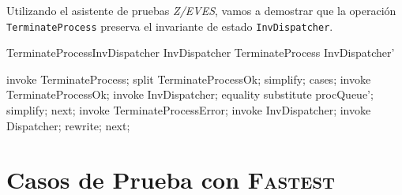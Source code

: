 \documentclass{article}
\begin{document}
Utilizando el asistente de pruebas \textit{Z/EVES}, vamos a demostrar que la operación \verb|TerminateProcess| preserva el invariante de estado \verb|InvDispatcher|.

\begin{theorem}{TerminateProcessInvDispatcher}
    InvDispatcher \land TerminateProcess \implies InvDispatcher'
\end{theorem}

\begin{zproof}[TerminateProcessInvDispatcher]
    invoke TerminateProcess;
    split TerminateProcessOk;
    simplify;
    cases;
    invoke TerminateProcessOk;
    invoke InvDispatcher;
    equality substitute procQueue';
    simplify;
    next;
    invoke TerminateProcessError;
    invoke InvDispatcher;
    invoke \Xi Dispatcher;
    rewrite;
    next;
\end{zproof}

\section{Casos de Prueba con \textsc{Fastest}}
\end{document}
